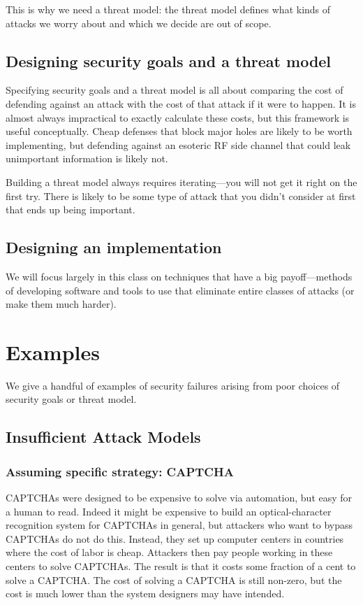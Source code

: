 This is why we need a threat model: the threat
model defines what kinds of attacks we worry about
and which we decide are out of scope.

\subsection{Designing security goals and a threat model}
Specifying security goals and
a threat model is all about comparing
the cost of defending against an attack with the
cost of that attack if it were to happen.
It is almost always impractical to exactly calculate
these costs, but this framework is useful
conceptually.
Cheap defenses that block major
holes are likely to be worth implementing, but
defending against an esoteric RF side channel that
could leak unimportant information is likely not.

Building a threat model always requires iterating---you will not get it right on the first try.
There is likely to be some type of attack that you didn't consider at first that ends up being important.

\subsection{Designing an implementation}
We will focus largely in this class on techniques
that have a big payoff---methods of developing
software and tools to use that eliminate entire
classes of attacks (or make them much harder). 

\section{Examples}

We give a handful of examples of security failures arising from poor
choices of security goals or threat model.

\subsection{Insufficient Attack Models}

\subsubsection{Assuming specific strategy: CAPTCHA}
CAPTCHAs were designed to be expensive to
solve via automation, but easy for a human to read.
Indeed it might be expensive to build an optical-character recognition 
system for CAPTCHAs in general, but attackers who want
to bypass CAPTCHAs do not do this.
Instead, they set up computer centers in countries where the cost of
labor is cheap. Attackers then pay people working in these 
centers to solve CAPTCHAs.\autocite{motoyama:recaptchas}
The result is that it costs some fraction of
a cent to solve a CAPTCHA. 
The cost of solving a CAPTCHA is still non-zero,
but the cost is much lower than the system designers
may have intended.

